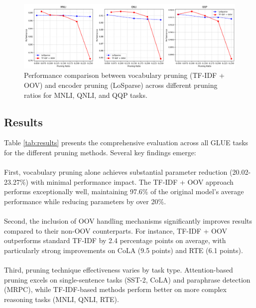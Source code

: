 \documentclass[twocolumn]{article}
\begin{document}
\begin{figure}[t]
    \centering
    \includegraphics[width=\linewidth]{images/pruning_ratios.png}
    \caption{Performance comparison between vocabulary pruning (TF-IDF + OOV) and encoder pruning (LoSparse) across different pruning ratios for MNLI, QNLI, and QQP tasks. }
    \label{fig:pruning_ratio}
\end{figure}

\subsection{Results}
Table \ref{tab:results} presents the comprehensive evaluation across all GLUE tasks for the different pruning methods. Several key findings emerge:
\\ \\
First, vocabulary pruning alone achieves substantial parameter reduction (20.02-23.27\%) with minimal performance impact. The TF-IDF + OOV approach performs exceptionally well, maintaining 97.6\% of the original model's average performance while reducing parameters by over 20\%.
\\ \\
Second, the inclusion of OOV handling mechanisms significantly improves results compared to their non-OOV counterparts. For instance, TF-IDF + OOV outperforms standard TF-IDF by 2.4 percentage points on average, with particularly strong improvements on CoLA (9.5 points) and RTE (6.1 points).
\\ \\
Third, pruning technique effectiveness varies by task type. Attention-based pruning excels on single-sentence tasks (SST-2, CoLA) and paraphrase detection (MRPC), while TF-IDF-based methods perform better on more complex reasoning tasks (MNLI, QNLI, RTE).
\\ \\
\end{document}

